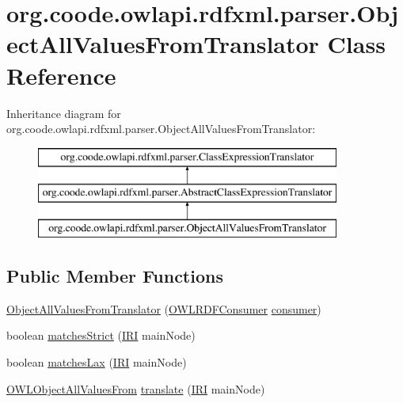 \hypertarget{classorg_1_1coode_1_1owlapi_1_1rdfxml_1_1parser_1_1_object_all_values_from_translator}{\section{org.\-coode.\-owlapi.\-rdfxml.\-parser.\-Object\-All\-Values\-From\-Translator Class Reference}
\label{classorg_1_1coode_1_1owlapi_1_1rdfxml_1_1parser_1_1_object_all_values_from_translator}
}
Inheritance diagram for org.\-coode.\-owlapi.\-rdfxml.\-parser.\-Object\-All\-Values\-From\-Translator\-:\begin{figure}[H]
\begin{center}
\leavevmode
\includegraphics[height=3.000000cm]{classorg_1_1coode_1_1owlapi_1_1rdfxml_1_1parser_1_1_object_all_values_from_translator}
\end{center}
\end{figure}
\subsection*{Public Member Functions}
\begin{DoxyCompactItemize}
\item 
\hyperlink{classorg_1_1coode_1_1owlapi_1_1rdfxml_1_1parser_1_1_object_all_values_from_translator_afa8050ed00f49ca93c9ed4f7521c5e96}{Object\-All\-Values\-From\-Translator} (\hyperlink{classorg_1_1coode_1_1owlapi_1_1rdfxml_1_1parser_1_1_o_w_l_r_d_f_consumer}{O\-W\-L\-R\-D\-F\-Consumer} \hyperlink{classorg_1_1coode_1_1owlapi_1_1rdfxml_1_1parser_1_1_abstract_class_expression_translator_ae547084cdd5b92c03835b5aa404f823b}{consumer})
\item 
boolean \hyperlink{classorg_1_1coode_1_1owlapi_1_1rdfxml_1_1parser_1_1_object_all_values_from_translator_a6771da81c7e257fc97ddc927eed1f9fc}{matches\-Strict} (\hyperlink{classorg_1_1semanticweb_1_1owlapi_1_1model_1_1_i_r_i}{I\-R\-I} main\-Node)
\item 
boolean \hyperlink{classorg_1_1coode_1_1owlapi_1_1rdfxml_1_1parser_1_1_object_all_values_from_translator_a5294072e728a7aa0508bedff19e7fd74}{matches\-Lax} (\hyperlink{classorg_1_1semanticweb_1_1owlapi_1_1model_1_1_i_r_i}{I\-R\-I} main\-Node)
\item 
\hyperlink{interfaceorg_1_1semanticweb_1_1owlapi_1_1model_1_1_o_w_l_object_all_values_from}{O\-W\-L\-Object\-All\-Values\-From} \hyperlink{classorg_1_1coode_1_1owlapi_1_1rdfxml_1_1parser_1_1_object_all_values_from_translator_a09830ff28917aa3f29224ddc87f1d1e8}{translate} (\hyperlink{classorg_1_1semanticweb_1_1owlapi_1_1model_1_1_i_r_i}{I\-R\-I} main\-Node)
\end{DoxyCompactItemize}
